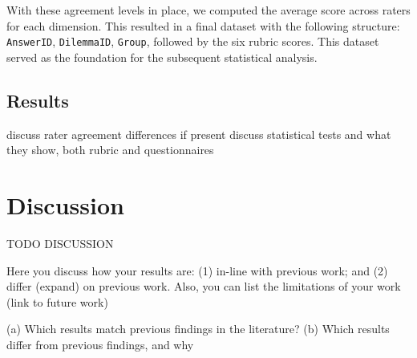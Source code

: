 \documentclass[sigconf, authorversion, nonacm, screen]{acmart}
\begin{document}
With these agreement levels in place, we computed the average score across raters for each dimension. This resulted in a final dataset with the following structure: \texttt{AnswerID}, \texttt{DilemmaID}, \texttt{Group}, followed by the six rubric scores. This dataset served as the foundation for the subsequent statistical analysis.

\subsection{Results}

discuss rater agreement differences if present
discuss statistical tests and what they show, both rubric and questionnaires

\section{Discussion}
TODO DISCUSSION

Here you discuss how your results are: (1) in-line with previous work; and (2) differ
(expand) on previous work. Also, you can list the limitations of your work (link to future work)

(a) Which results match previous findings in the literature?
(b) Which results differ from previous findings, and why



\end{document}

